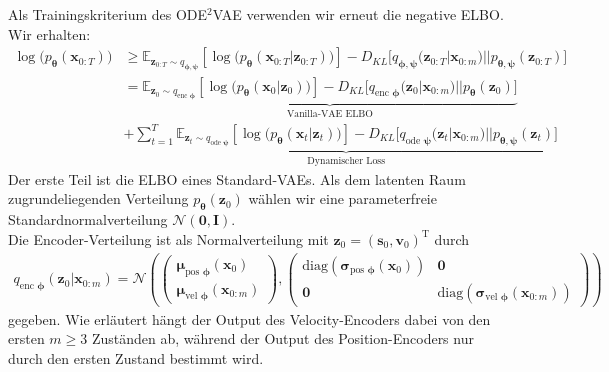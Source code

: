 \documentclass[12pt]{article}
\newcommand{\E}{\mathbb{E}}
\begin{document}
	Als Trainingskriterium des ODE$^2$VAE verwenden wir erneut die negative ELBO.
	Wir erhalten:
	\begin{align*}
	\log\big(p_{\boldsymbol{\theta}}(\mathbf{x}_{0:T})\big)&\ge \E_{\mathbf{z}_{0:T}\sim q_{\boldsymbol\phi,\boldsymbol\psi}}
	\left[\log\big(p_{\boldsymbol\theta}\left(\mathbf{x}_{0:T}|\mathbf{z}_{0:T}\right)\big)\right] - D_{KL}\big[q_{\boldsymbol\phi,\boldsymbol\psi}(\mathbf{z}_{0:T}|\mathbf{x}_{0:m})||p_{\boldsymbol\theta,\boldsymbol\psi}(\mathbf{z}_{0:T})\big]\\
	&=\underbrace{\E_{\mathbf{z}_{0}\sim q_{\text{enc }\boldsymbol\phi}}
		\left[\log\big(p_{\boldsymbol\theta}\left(\mathbf{x}_{0}|\mathbf{z}_{0}\right)\big)\right] - D_{KL}\big[q_{\text{enc }\boldsymbol\phi}(\mathbf{z}_{0}|\mathbf{x}_{0:m})||p_{\boldsymbol\theta}(\mathbf{z}_{0})\big]}_{\text{Vanilla-VAE ELBO}}\\ &+ \underbrace{\sum_{t=1}^T \E_{\mathbf{z}_{t}\sim q_{\text{ode }\boldsymbol\psi}}
		\left[\log\big(p_{\boldsymbol\theta}\left(\mathbf{x}_{t}|\mathbf{z}_{t}\right)\big)\right] - D_{KL}\big[q_{\text{ode }\boldsymbol\psi}(\mathbf{z}_{t}|\mathbf{x}_{0:m})||p_{\boldsymbol\theta,\boldsymbol\psi}(\mathbf{z}_{t})\big]}_{\text{Dynamischer Loss}}
	\end{align*}
	Der erste Teil ist die ELBO eines Standard-VAEs.
	Als dem latenten Raum zugrundeliegenden Verteilung $p_{\boldsymbol\theta}(\mathbf{z}_{0})$ wählen wir eine parameterfreie Standardnormalverteilung $\mathcal{N}(\mathbf{0},\mathbf{I})$.\\
	Die Encoder-Verteilung ist als Normalverteilung mit $\mathbf{z}_{0} = (\mathbf{s}_{0},\mathbf{v}_{0})^{\mathrm{T}}$ durch
	\begin{align*}
	q_{\text{enc }\boldsymbol\phi}(\mathbf{z}_{0}|\mathbf{x}_{0:m}) =
	\mathcal{N}\left(\left(\begin{array}{cc}
	\boldsymbol\mu_{\text{pos }\boldsymbol\phi}(\textbf{x}_{0}) \\
	\boldsymbol\mu_{\text{vel }\boldsymbol\phi}(\textbf{x}_{0:m})
	\end{array}\right),\left(\begin{array}{cc}
	\text{diag}(\boldsymbol\sigma_{\text{pos }\boldsymbol\phi}(\textbf{x}_{0})) &
	\mathbf{0}\\
	\mathbf{0} &
	\text{diag}(\boldsymbol\sigma_{\text{vel }\boldsymbol\phi}(\textbf{x}_{0:m}))
	\end{array}\right)\right)
	\end{align*}
	gegeben. Wie erläutert hängt der Output des Velocity-Encoders dabei von den ersten $m\ge3$ Zuständen ab, während der Output des Position-Encoders nur durch den ersten Zustand bestimmt wird.\\
\end{document}
